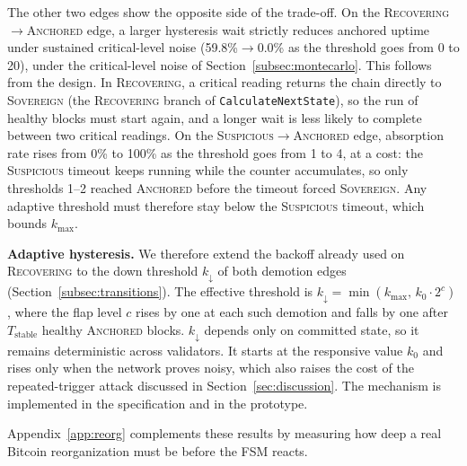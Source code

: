 The other two edges show the opposite side of the trade-off. On the \textsc{Recovering}$\to$\textsc{Anchored} edge, a
larger hysteresis wait strictly reduces anchored uptime under sustained
critical-level noise (59.8\%$\to$0.0\% as the threshold goes from 0 to 20),
under the critical-level noise of Section~\ref{subsec:montecarlo}. This
follows from the design. In \textsc{Recovering}, a critical reading returns the
chain directly to \textsc{Sovereign} (the \textsc{Recovering} branch of
\texttt{CalculateNextState}), so the run of healthy blocks must start again,
and a longer wait is less likely to complete between two critical readings. On the \textsc{Suspicious}$\to$\textsc{Anchored} edge, absorption rate
rises from 0\% to 100\% as the threshold goes from 1 to 4, at a cost: the \textsc{Suspicious} timeout keeps running while the
counter accumulates, so only thresholds 1--2 reached \textsc{Anchored}
before the timeout forced \textsc{Sovereign}. Any adaptive threshold
must therefore stay below the \textsc{Suspicious} timeout, which bounds
$k_{\max}$. 

\textbf{Adaptive hysteresis.} We therefore extend the backoff already used on
\textsc{Recovering} to the down threshold $k_{\downarrow}$ of both demotion
edges (Section~\ref{subsec:transitions}). The effective threshold is
$k_{\downarrow} = \min(k_{\max},\, k_0 \cdot 2^{c})$, where the flap level $c$
rises by one at each such demotion and falls by one after $T_{\text{stable}}$
healthy \textsc{Anchored} blocks. $k_{\downarrow}$ depends only on committed
state, so it remains deterministic across validators. It starts at the
responsive value $k_0$ and rises only when the network proves noisy, which
also raises the cost of the repeated-trigger attack discussed in
Section~\ref{sec:discussion}. The mechanism is implemented in the
specification and in the prototype.

Appendix~\ref{app:reorg} complements these results by measuring how deep a
real Bitcoin reorganization must be before the FSM reacts.

